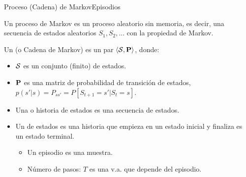 \documentclass[10pt, envcountsect, handout, aspectratio=1610, hyperref={hypertexnames=true}]{beamer}
\begin{document}
\begin{frame}{Proceso (Cadena) de Markov}{Episodios}


\begin{definition}
	Un proceso de Markov es un proceso aleatorio sin memoria, es decir, 
	una secuencia de estados aleatorios $S_1, S_2, ...$ con la propiedad de Markov.
\end{definition}
    
\begin{definition}
    Un  (o Cadena de Markov) es un par $\langle {\cal S}, \mathbf{P} \rangle$, donde:
    \begin{itemize}
        \item ${\cal S}$ es un conjunto (finito) de estados.
        \item $\mathbf{P}$ es una matriz de probabilidad de transición de estados, $p(s'|s)=P_{ss'} = P [S_{t+1} = s' | S_t = s]$.
    \end{itemize}
\end{definition}

\begin{definition}
\begin{itemize}
\item Una  o historia de estados es una secuencia de estados.
\item Un  de estados es una historia que empieza en un estado inicial y finaliza es un estado terminal.
	\begin{itemize}
	\item Un episodio es una muestra.
	\item Número de pasos: $T$ es una v.a. que depende del episodio.
	\end{itemize}
\end{itemize}
\end{definition}

\end{frame}
\end{document}
